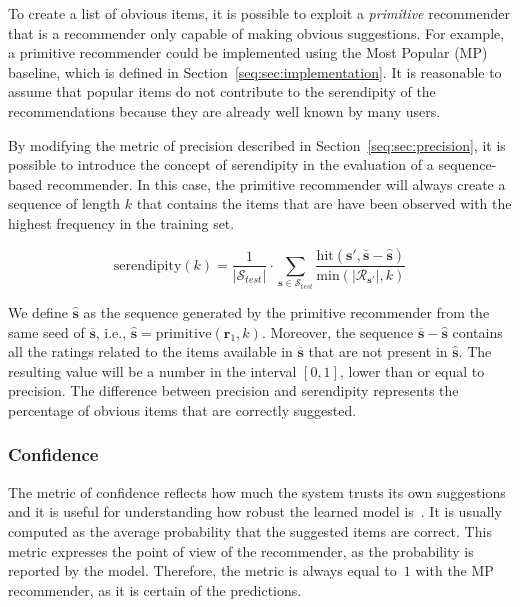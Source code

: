 To create a list of obvious items, it is possible to exploit a \emph{primitive} recommender that is a recommender only capable of making obvious suggestions. For example, a primitive recommender could be implemented using the Most Popular (MP) baseline, which is defined in Section~\ref{seq:sec:implementation}. It is reasonable to assume that popular items do not contribute to the serendipity of the recommendations because they are already well known by many users.

By modifying the metric of precision described in Section~\ref{seq:sec:precision}, it is possible to introduce the concept of serendipity in the evaluation of a sequence-based recommender. In this case, the primitive recommender will always create a sequence of length $k$ that contains the items that are have been observed with the highest frequency in the training set.

\begin{equation}
\mathrm{serendipity}(k) = \frac{1}{|\mathcal{S}_{test}|} \cdot \sum_{\mathbf{s} \in \mathcal{S}_{test}} \frac{\mathrm{hit}(\mathbf{s'}, \mathbf{\overline{s}} - \mathbf{\hat{s}})}{\mathrm{min}(|\mathcal{R}_{\mathbf{s'}}|, k)}
\end{equation}

We define $\mathbf{\hat{s}}$ as the sequence generated by the primitive recommender from the same seed of $\mathbf{\overline{s}}$, i.e., $\mathbf{\hat{s}} = \mathrm{primitive}(\mathbf{r}_1, k)$. Moreover, the sequence $\mathbf{\overline{s}} - \mathbf{\hat{s}}$ contains all the ratings related to the items available in $\mathbf{\overline{s}}$ that are not present in $\mathbf{\hat{s}}$. The resulting value will be a number in the interval $[0, 1]$, lower than or equal to precision. The difference between precision and serendipity represents the percentage of obvious items that are correctly suggested.

\subsubsection{Confidence}

The metric of confidence reflects how much the system trusts its own suggestions and it is useful for understanding how robust the learned model is~\cite{Herlocker2000}. It is usually computed as the average probability that the suggested items are correct. This metric expresses the point of view of the recommender, as the probability is reported by the model. Therefore, the metric is always equal to~$1$ with the MP recommender, as it is certain of the predictions.

